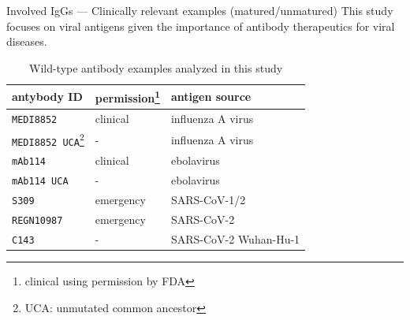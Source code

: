 \documentclass[10pt]{beamer}
\begin{document}
\begin{frame}{Involved IgGs \normalsize --- Clinically relevant examples (matured/unmatured)}
    This study focuses on viral antigens given the importance of antibody therapeutics for viral diseases.
    \bigskip
    \begin{table}[H]
        \small
        \centering
        \begin{tabular}{lll}
            \toprule
            antybody ID               & permission\footnote{clinical using permission by FDA}    & antigen source \\
            \midrule
            \texttt{MEDI8852}         & clinical  & influenza A virus \\ %
            \texttt{MEDI8852 UCA}\footnote{UCA: unmutated common ancestor}     & -             & influenza A virus \\ %
            \texttt{mAb114}           & clinical  & ebolavirus \\ %
            \texttt{mAb114 UCA}       & -             & ebolavirus \\ %
            \texttt{S309}             & emergency & SARS-CoV-1/2 \\ %
            \texttt{REGN10987}        & emergency & SARS-CoV-2 \\ %
            \texttt{C143}             & -             & SARS-CoV-2 Wuhan-Hu-1 \\ %
            \bottomrule
        \end{tabular}
        \caption{Wild-type antibody examples analyzed in this study}
        \label{tab:egantibody}
    \end{table}
    
\end{frame}

\end{document}
